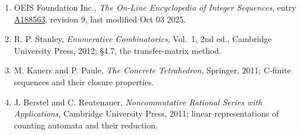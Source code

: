 \documentclass[11pt]{article}
\theoremstyle{definition}
\begin{document}
\begin{enumerate}

\item OEIS Foundation Inc., \emph{The On-Line Encyclopedia of Integer Sequences}, entry \href{https://oeis.org/A188563}{A188563}, revision 9, last modified Oct 03 2025.

\item R. P. Stanley, \emph{Enumerative Combinatorics}, Vol.~1, 2nd ed., Cambridge University Press, 2012; \S4.7, the transfer-matrix method.

\item M. Kauers and P. Paule, \emph{The Concrete Tetrahedron}, Springer, 2011; C-finite sequences and their closure properties.

\item J. Berstel and C. Reutenauer, \emph{Noncommutative Rational Series with Applications}, Cambridge University Press, 2011; linear representations of counting automata and their reduction.

\end{enumerate}
\end{document}
